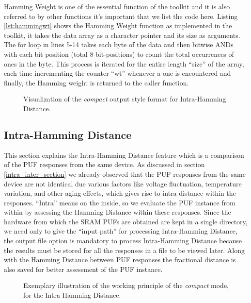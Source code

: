 Hamming Weight is one of the essential function of the toolkit and it is also referred to by other functions it's important that we list the code here. Listing \ref{lst:hammingwt} shows the Hamming Weight function as implemented in the toolkit, it takes the data array as a character pointer and its size as arguments. The for loop in lines 5-14 takes each byte of the data and then bitwise ANDs with each bit position (total 8 bit-positions) to count the total occurrences of ones in the byte. This process is
iterated for the entire length ``size'' of the array, each time incrementing the counter ``wt'' whenever a one is encountered and finally, the Hamming weight is returned to the caller function.\\

\begin{figure}
\centering
{}
\caption{Visualization of the \emph{compact} output style format for Intra-Hamming Distance.}
\label{img:4_intra_compact}
\end{figure}

\subsection{Intra-Hamming Distance}
\label{intra_hd_section}
This section explains the Intra-Hamming Distance feature which is a comparison of the PUF responses from the same device. As discussed in section \ref{intra_inter_section} we already observed that the PUF responses from the same device are not identical due various factors like voltage fluctuation,  temperature variation, and other aging effects, which gives rise to intra distance within the responses. ``Intra'' means on the inside, so we evaluate the PUF instance from within by assessing the Hamming Distance within
these responses. Since the hardware from which the SRAM PUFs are obtained are kept in a single directory, we need only to give the ``input path'' for processing Intra-Hamming Distance, the output file option is mandatory to process Intra-Hamming Distance because the results must be stored for all the responses in a file to be viewed later. Along with the Hamming Distance between PUF responses the fractional distance is also saved for better assessment of the PUF instance.\\

\begin{figure}[]
\centering
{}
\caption{Exemplary illustration of the working principle of the \emph{compact} mode, for the Intra-Hamming Distance.}
\label{img:4_intra_WP}
\end{figure}

